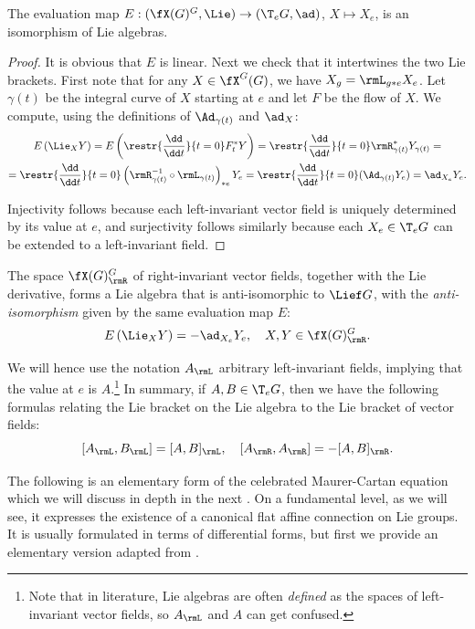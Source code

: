 \begin{thm}
    The evaluation map $E:(\fX(G)^G,\Lie)\to (\T_eG,\ad)$, $X\mapsto X_e$, is an isomorphism of Lie algebras.
\end{thm}
\begin{proof}
    It is obvious that $E$ is linear. Next we check that it intertwines the two Lie brackets. First note that for any $X\in \fX^G(G)$, we have $X_g=\rmL_{g\ast e}X_e$. Let $\gamma(t)$ be the integral curve of $X$ starting at $e$ and let $F$ be the flow of $X$. We compute, using the definitions of $\Ad_{\gamma(t)}$ and $\ad_X$:
    \begin{multline}
        E\left(\Lie_X Y\right)=E\left(\restr{\frac{\dd}{\dd t}}{t=0} F^\ast_t Y\right)= \restr{\frac{\dd}{\dd t}}{t=0}\rmR_{\gamma(t)}^{\ast}Y_{\gamma(t)}=\\=\restr{\frac{\dd}{\dd t}}{t=0}\left(\rmR_{\gamma(t)}^{-1}\circ \rmL_{\gamma(t)}\right)_{\ast e} Y_{e}=\restr{\frac{\dd}{\dd t}}{t=0}(\Ad_{\gamma(t)}Y_e)=\ad_{X_e} Y_e.
    \end{multline}

    Injectivity follows because each left-invariant vector field is uniquely determined by its value at $e$, and surjectivity follows similarly because each $X_e\in \T_eG$ can be extended to a left-invariant field.
\end{proof}
\begin{cor}
    The space $\fX(G)^G_\rmR$ of right-invariant vector fields, together with the Lie derivative, forms a Lie algebra that is anti-isomorphic to $\Lief G$, with the \emph{anti-isomorphism} given by the same evaluation map $E$:
    \[E\left(\Lie_{X}Y\right)=-\ad_{X_e} Y_e,\quad X,Y\in\fX(G)^G_\rmR.\]
\end{cor}

We will hence use the notation $A_\rmL$ arbitrary left-invariant fields, implying that the value at $e$ is $A$.\footnote{Note that in literature, Lie algebras are often \emph{defined} as the spaces of left-invariant vector fields, so $A_\rmL$ and $A$ can get confused.} In summary, if $A,B\in \T_eG$, then we have the following formulas relating the Lie bracket on the Lie algebra to the Lie bracket of vector fields:
\[[A_\rmL,B_\rmL]=[A,B]_\rmL,\quad [A_\rmR,A_\rmR]=-[A,B]_\rmR.\]


The following is an elementary form of the celebrated Maurer-Cartan equation which we will discuss in depth in the next \sect. On a fundamental level, as we will see, it expresses the existence of a canonical flat affine connection on Lie groups. It is usually formulated in terms of differential forms, but first we provide an elementary version adapted from \cite{Onishchik}.

